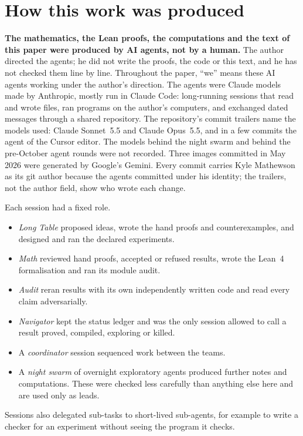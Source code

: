 \documentclass[11pt]{article}
\begin{document}
\section{How this work was produced}\label{sec:disclosure}
\textbf{The mathematics, the Lean proofs, the computations and the text of this paper were produced by AI agents, not by a human.} The author directed the agents; he did not write the proofs, the code or this text, and he has not checked them line by line. Throughout the paper, ``we'' means these AI agents working under the author's direction. The agents were Claude models made by Anthropic, mostly run in Claude Code: long-running sessions that read and wrote files, ran programs on the author's computers, and exchanged dated messages through a shared repository. The repository's commit trailers name the models used: Claude Sonnet~5.5 and Claude Opus~5.5, and in a few commits the agent of the Cursor editor. The models behind the night swarm and behind the pre-October agent rounds were not recorded. Three images committed in May 2026 were generated by Google's Gemini. Every commit carries Kyle Mathewson as its git author because the agents committed under his identity; the trailers, not the author field, show who wrote each change.

Each session had a fixed role.
\begin{itemize}
\item \emph{Long Table} proposed ideas, wrote the hand proofs and counterexamples, and designed and ran the declared experiments.
\item \emph{Math} reviewed hand proofs, accepted or refused results, wrote the Lean~4 formalisation and ran its module audit.
\item \emph{Audit} reran results with its own independently written code and read every claim adversarially.
\item \emph{Navigator} kept the status ledger and was the only session allowed to call a result proved, compiled, exploring or killed.
\item A \emph{coordinator} session sequenced work between the teams.
\item A \emph{night swarm} of overnight exploratory agents produced further notes and computations. These were checked less carefully than anything else here and are used only as leads.
\end{itemize}
Sessions also delegated sub-tasks to short-lived sub-agents, for example to write a checker for an experiment without seeing the program it checks.
\end{document}
